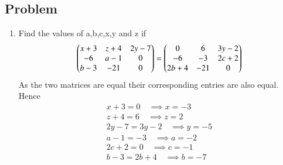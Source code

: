 \subsection{Problem}

\renewcommand{\theequation}{\theenumi}
\begin{enumerate}[label=\thesection.\arabic*.,ref=\thesection.\theenumi]
\item Find the values of a,b,c,x,y and z if
\begin{multline}
\begin{pmatrix}x+3&z+4&2y-7\\-6&a-1&0\\b-3&-21&0\end{pmatrix} = \begin{pmatrix}0&6&3y-2\\-6&-3&2c+2\\2b+4&-21&0\end{pmatrix}
\end{multline}
\solution As the two matrices are equal their corresponding entries are also equal. Hence
\begin{align}
x+3=0 \quad \implies x=-3
\\
z+4=6 \quad \implies z=2
\\
2y-7=3y-2 \quad \implies y=-5
\\
a-1=-3 \quad \implies a=-2
\\
2c+2=0 \quad \implies c=-1
\\
b-3=2b+4 \quad \implies b=-7
\end{align}






\end{enumerate}
